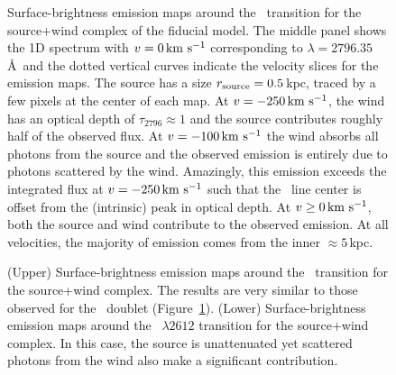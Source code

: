 \documentclass[12pt,preprint]{aastex}
\begin{document}
\begin{figure}
\caption{
Surface-brightness emission maps around the \mgiia\ transition for the
source+wind complex of the fiducial model.  The middle panel shows the
1D spectrum with $v=0 
\, {\rm km~s^{-1}}$ corresponding to $\lambda = 2796.35$\AA\ and the dotted vertical
curves indicate the velocity slices for the emission maps.  The
source has a size $r_{\rm source} = 0.5$\,kpc, traced by a few
pixels at the center of each map.   At $v=-250 \, {\rm km~s^{-1}}$, the wind has an optical
depth of $\tau_{2796} \approx 1$ and the source contributes
roughly half of the observed flux.  At $v=-100 \, {\rm km~s^{-1}}$ the
wind absorbs all photons from the source and the observed emission is
entirely due to photons scattered by the wind.  Amazingly, this
emission exceeds the integrated flux at $v = -250\, {\rm km~s^{-1}}$ such that the
\mgiia\ line center is offset from the (intrinsic) peak in optical depth.  At $v \ge 0
\, {\rm km~s^{-1}}$,  both the source and wind contribute to the observed emission.
At all velocities, the majority of emission comes from the inner
$\approx 5$\,kpc.
}
\label{fig:fiducial_ifu_mgii}
\end{figure}

\begin{figure}
\caption{
(Upper) Surface-brightness emission maps around the \feiib\ transition for the
source+wind complex.  
The results are very similar to those observed for the \mgiid\ doublet
(Figure~\ref{fig:fiducial_ifu_mgii}).
(Lower) Surface-brightness emission maps around the ~$\lambda
2612$ transition for the 
source+wind complex.  %
In this case, the source is unattenuated yet scattered photons from
the wind also make a significant contribution. 
}
\label{fig:fiducial_ifu_feii}
\end{figure}

\end{document}
